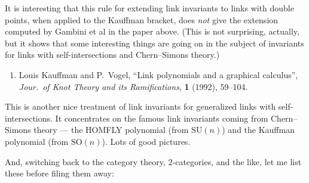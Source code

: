 \documentclass[12pt]{article}
\def\tightlist{}
\renewcommand{\texttt}[1]{%
  \begingroup
  \ttfamily
  \begingroup\lccode`~=`/\lowercase{\endgroup\def~}{/\discretionary{}{}{}}%
  \begingroup\lccode`~=`[\lowercase{\endgroup\def~}{[\discretionary{}{}{}}%
  \begingroup\lccode`~=`.\lowercase{\endgroup\def~}{.\discretionary{}{}{}}%
  \catcode`/=\active\catcode`[=\active\catcode`.=\active
  \scantokens{#1\noexpand}%
  \endgroup
}
\begin{document}
It is interesting that this rule for extending link invariants to links
with double points, when applied to the Kauffman bracket, does
\emph{not} give the extension computed by Gambini et al in the paper
above. (This is not surprising, actually, but it shows that some
interesting things are going on in the subject of invariants for links
with self-intersections and Chern--Simons theory.)

\begin{enumerate}
\def\labelenumi{\arabic{enumi})}
\setcounter{enumi}{2}
\tightlist
\item
  Louis Kauffman and
  P.\ Vogel, ``Link polynomials and a graphical calculus'', \emph{Jour.\ of Knot Theory and its Ramifications},
  \textbf{1} (1992), 59--104.
\end{enumerate}

This is another nice treatment of link invariants for generalized links
with self-intersections. It concentrates on the famous link invariants
coming from Chern--Simons theory --- the HOMFLY polynomial (from
\(\mathrm{SU}(n)\)) and the Kauffman polynomial (from
\(\mathrm{SO}(n)\)). Lots of good pictures.

And, switching back to the category theory, \(2\)-categories, and the
like, let me list these before filing them away:

\end{document}

